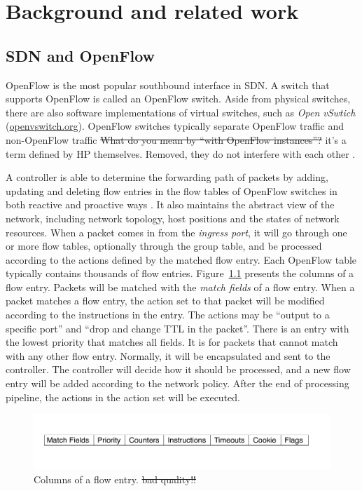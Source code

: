\chapter{Background and related work}
\section{SDN and OpenFlow}

OpenFlow is the most popular southbound interface in SDN. A switch that supports OpenFlow is called an OpenFlow switch. Aside from physical switches, there are also software implementations of virtual switches, such as \textit{Open vSwtich} (\url{openvswitch.org}). OpenFlow switches typically separate OpenFlow traffic and non-OpenFlow traffic\sout{{\color{red} What do you mean by ``with OpenFlow instances''?}} {\color{blue}it's a term defined by HP themselves. Removed}, they do not interfere with each other \cite{HP_SPEC}.

A controller is able to determine the forwarding path of packets by adding, updating and deleting flow entries in the flow tables of OpenFlow switches in both reactive and proactive ways \cite{OF_SPEC}. It also maintains the abstract view of the network, including network topology, host positions and the states of network resources. When a packet comes in from the \textit{ingress port}, it will go through one or more flow tables, optionally through the group table, and be processed according to the actions defined by the matched flow entry. Each OpenFlow table typically contains thousands of flow entries. Figure~\ref{FE_Col} presents the columns of a flow entry. Packets will be matched with the \textit{match fields} of a flow entry. When a packet matches a flow entry, the action set to that packet will be modified according to the instructions in the entry. The actions may be ``output to a specific port'' and ``drop and change TTL in the packet''. There is an entry with the lowest priority that matches all fields. It is for packets that cannot match with any other flow entry. Normally, it will be encapsulated and sent to the controller. The controller will decide how it should be processed, and a new flow entry will be added according to the network policy. After the end of processing pipeline, the actions in the action set will be executed.%

\begin{figure}[H]
\begin{center} 
\includegraphics[width=1\textwidth]{figures/columns_of_flow_entry.png}
\end{center}
\caption{Columns of a flow entry. \sout{{\color{red} bad quality!!}}}
\label{FE_Col}
\end{figure}

